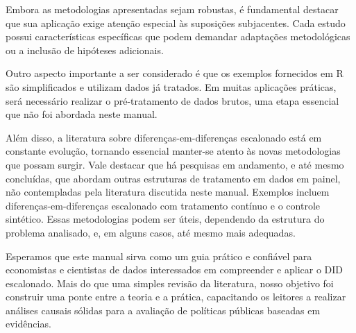 \documentclass[portugues]{article}
\begin{document}
Embora as metodologias apresentadas sejam robustas, é fundamental destacar que sua aplicação exige atenção especial às suposições subjacentes. Cada estudo possui características específicas que podem demandar adaptações metodológicas ou a inclusão de hipóteses adicionais.

Outro aspecto importante a ser considerado é que os exemplos fornecidos em R são simplificados e utilizam dados já tratados. Em muitas aplicações práticas, será necessário realizar o pré-tratamento de dados brutos, uma etapa essencial que não foi abordada neste manual.

Além disso, a literatura sobre diferenças-em-diferenças escalonado está em constante evolução, tornando essencial manter-se atento às novas metodologias que possam surgir. Vale destacar que há pesquisas em andamento, e até mesmo concluídas, que abordam outras estruturas de tratamento em dados em painel, não contempladas pela literatura discutida neste manual. Exemplos incluem diferenças-em-diferenças escalonado com tratamento contínuo e o controle sintético. Essas metodologias podem ser úteis, dependendo da estrutura do problema analisado, e, em alguns casos, até mesmo mais adequadas.

Esperamos que este manual sirva como um guia prático e confiável para economistas e cientistas de dados interessados em compreender e aplicar o DID escalonado. Mais do que uma simples revisão da literatura, nosso objetivo foi construir uma ponte entre a teoria e a prática, capacitando os leitores a realizar análises causais sólidas para a avaliação de políticas públicas baseadas em evidências.

    
\newpage
%

\end{document}
